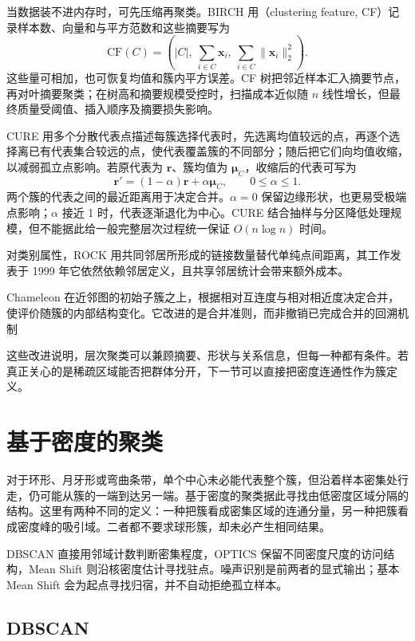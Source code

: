 当数据装不进内存时，可先压缩再聚类。BIRCH 用（clustering feature, CF）记录样本数、向量和与平方范数和这些摘要写为
\[
 \mathrm{CF}(C)=
 \left(|C|,\ \sum_{i\in C}\bm{x}_i,\
 \sum_{i\in C}\lVert\bm{x}_i\rVert_2^2\right).
\]
这些量可相加，也可恢复均值和簇内平方误差。CF 树把邻近样本汇入摘要节点，再对叶摘要聚类；在树高和摘要规模受控时，扫描成本近似随 $n$ 线性增长，但最终质量受阈值、插入顺序及摘要损失影响。

CURE 用多个分散代表点描述每簇选择代表时，先选离均值较远的点，再逐个选择离已有代表集合较远的点，使代表覆盖簇的不同部分；随后把它们向均值收缩，以减弱孤立点影响。若原代表为 $\bm{r}$、簇均值为 $\bm{\mu}_C$，收缩后的代表可写为
\[
 \bm{r}'=(1-\alpha)\bm{r}+\alpha\bm{\mu}_C,
 \qquad 0\leq\alpha\leq1.
\]
两个簇的代表之间的最近距离用于决定合并。$\alpha=0$ 保留边缘形状，也更易受极端点影响；$\alpha$ 接近 1 时，代表逐渐退化为中心。CURE 结合抽样与分区降低处理规模，但不能据此给一般完整层次过程统一保证 $O(n\log n)$ 时间。

对类别属性，ROCK 用共同邻居所形成的链接数量替代单纯点间距离，其工作发表于 1999 年它依然依赖邻居定义，且共享邻居统计会带来额外成本。

\Needspace{55mm}
Chameleon 在近邻图的初始子簇之上，根据相对互连度与相对相近度决定合并，使评价随簇的内部结构变化。它改进的是合并准则，而非撤销已完成合并的回溯机制

这些改进说明，层次聚类可以兼顾摘要、形状与关系信息，但每一种都有条件。若真正关心的是稀疏区域能否把群体分开，下一节可以直接把密度连通性作为簇定义。

\section{基于密度的聚类}
\label{sec:clustering-density}

对于环形、月牙形或弯曲条带，单个中心未必能代表整个簇，但沿着样本密集处行走，仍可能从簇的一端到达另一端。基于密度的聚类据此寻找由低密度区域分隔的结构。这里有两种不同的定义：一种把簇看成密集区域的连通分量，另一种把簇看成密度峰的吸引域。二者都不要求球形簇，却未必产生相同结果。

DBSCAN 直接用邻域计数判断密集程度，OPTICS 保留不同密度尺度的访问结构，Mean Shift 则沿核密度估计寻找驻点。噪声识别是前两者的显式输出；基本 Mean Shift 会为起点寻找归宿，并不自动拒绝孤立样本。

\subsection{DBSCAN}
\label{sec:clustering-dbscan}


